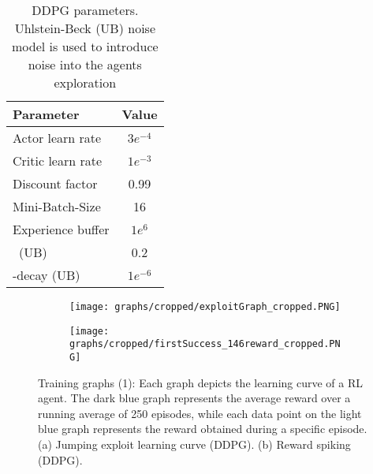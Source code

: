 {\def\arraystretch{1.4}\tabcolsep=5pt
\begin{table}
	\centering
	\begin{tabular}{| l | c |}
		\hline
		\textbf{Parameter} & \textbf{Value}\\
		\hline
		\hline
		Actor learn rate & $3e^{-4}$ \\
		Critic learn rate & $1e^{-3}$ \\
		Discount factor &  0.99 \\
		Mini-Batch-Size & 16 \\
		Experience buffer & $1e^6$\\
		\textsigma \ (UB) & 0.2 \\
		\textsigma-decay (UB) & $1e^{-6}$ \\
		
		\hline
	\end{tabular}
	\caption[DDPG parameters]{DDPG parameters. Uhlstein-Beck (UB) noise model is used to introduce noise into the agents exploration}
	\label{table: DDPG parameters}
\end{table}
}


\begin{figure}[h]
	\begin{subfigure}{\textwidth} %
		\centering
		\texttt{[image: graphs/cropped/exploitGraph\_cropped.PNG]}  %
		\caption{}
		\label{figure: RL a}
	\end{subfigure}
	\begin{subfigure}{\textwidth}
		\centering
		\texttt{[image: graphs/cropped/firstSuccess\_146reward\_cropped.PNG]}  
		\caption{}
		\label{figure: RL b}
	\end{subfigure} 
		\caption[Training graphs (1)]{Training graphs (1): Each graph depicts the learning curve of a RL agent. The dark blue graph represents the average reward over a running average of 250 episodes, while each data point on the light blue graph represents the reward obtained during a specific episode. (a) Jumping exploit learning curve (DDPG). (b) Reward spiking (DDPG).
		}
	\label{figure: DDPG learning graphs 1}
\end{figure}

